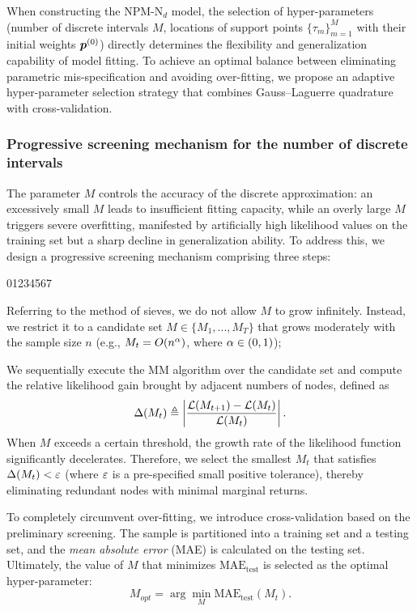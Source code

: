 When constructing the NPM-N$_d$ model, the selection of hyper-parameters (number of discrete intervals $M$, locations of support points $\{\tau_m\}_{m=1}^M$ with their initial weights ${\boldsymbol{p}}^{(0)}$) directly determines the flexibility and generalization capability of model fitting. To achieve an optimal balance between eliminating parametric mis-specification and avoiding over-fitting, we propose an adaptive hyper-parameter selection strategy that combines Gauss--Laguerre quadrature with cross-validation.

\subsubsection{Progressive screening mechanism for the number of discrete intervals}        %

The parameter $M$ controls the accuracy of the discrete approximation: an excessively small $M$ leads to insufficient fitting capacity, while an overly large $M$ triggers severe overfitting, manifested by artificially high likelihood values on the training set but a sharp decline in generalization ability. To address this, we design a progressive screening mechanism comprising three steps:

\begin{namelist}{01234567}
\item[\hspace{0.08cm} \tsf{Step 1:}]  Referring to the method of sieves, we do not allow $M$ to grow infinitely. Instead, we restrict it to a candidate set $M \in \{M_1, ..., M_T\}$ that grows moderately with the sample size $n$ (e.g., $M_t = O(n^\alpha)$, where $\alpha \in (0,1)$);

\item[\hspace{0.08cm} \tsf{Step 2:}]  We sequentially execute the MM algorithm over the candidate set and compute the relative likelihood gain brought by adjacent numbers of nodes, defined as 
$$
    \Delta(M_t) \triangleq \left|\frac{\mathcal{L}(M_{t+1}) - \mathcal{L}(M_t)}{\mathcal{L}(M_t)}\right|.
$$
When $M$ exceeds a certain threshold, the growth rate of the likelihood function significantly decelerates. Therefore, we select the smallest $M_t$ that satisfies $\Delta(M_t) < \varepsilon$ (where $\varepsilon$ is a pre-specified small positive tolerance), thereby eliminating redundant nodes with minimal marginal returns.

\item[\hspace{0.08cm} \tsf{Step 3:}]  To completely circumvent over-fitting, we introduce cross-validation based on the preliminary screening. The sample is partitioned into a training set and a testing set, and the \textit{mean absolute error} (MAE) is calculated on the testing set. Ultimately, the value of $M$ that minimizes $\mbox{MAE}_\text{test}$ is selected as the optimal hyper-parameter: 
$$
    M_{opt} = \arg\min_M \mbox{MAE}_\text{test}(M_t).
$$
\end{namelist}

